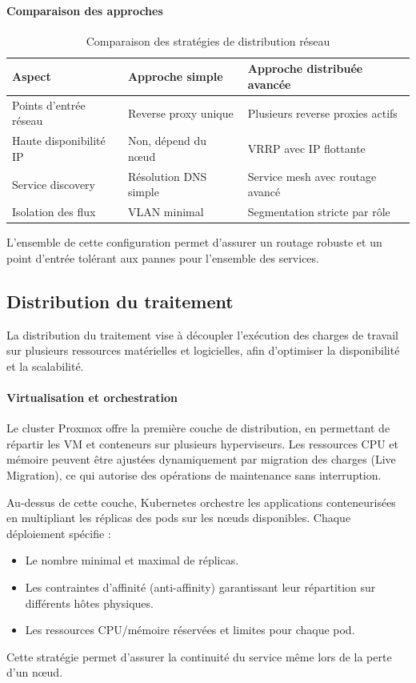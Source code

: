 \paragraph{Comparaison des approches}
\begin{table}[H]
	\renewcommand{\arraystretch}{1.3}
	\centering
	\begin{tabular}{|p{4cm}|p{5cm}|p{5cm}|}
		\hline
		\textbf{Aspect}        & \textbf{Approche simple} & \textbf{Approche distribuée avancée} \\
		\hline
		Points d’entrée réseau & Reverse proxy unique     & Plusieurs reverse proxies actifs     \\
		\hline
		Haute disponibilité IP & Non, dépend du nœud      & VRRP avec IP flottante               \\
		\hline
		Service discovery      & Résolution DNS simple    & Service mesh avec routage avancé     \\
		\hline
		Isolation des flux     & VLAN minimal             & Segmentation stricte par rôle        \\
		\hline
	\end{tabular}
	\caption{Comparaison des stratégies de distribution réseau}
\end{table}

L’ensemble de cette configuration permet d’assurer un routage robuste et un point d’entrée tolérant aux pannes pour l’ensemble des services.

\subsection{Distribution du traitement}

La distribution du traitement vise à découpler l’exécution des charges de travail sur plusieurs ressources matérielles et logicielles, afin d’optimiser la disponibilité et la scalabilité.

\paragraph{Virtualisation et orchestration}
Le cluster Proxmox offre la première couche de distribution, en permettant de répartir les VM et conteneurs sur plusieurs hyperviseurs. Les ressources CPU et mémoire peuvent être ajustées dynamiquement par migration des charges (Live Migration), ce qui autorise des opérations de maintenance sans interruption.

Au-dessus de cette couche, Kubernetes orchestre les applications conteneurisées en multipliant les réplicas des pods sur les nœuds disponibles. Chaque déploiement spécifie :
\begin{itemize}
	\item Le nombre minimal et maximal de réplicas.
	\item Les contraintes d’affinité (anti-affinity) garantissant leur répartition sur différents hôtes physiques.
	\item Les ressources CPU/mémoire réservées et limites pour chaque pod.
\end{itemize}
Cette stratégie permet d’assurer la continuité du service même lors de la perte d’un nœud.

